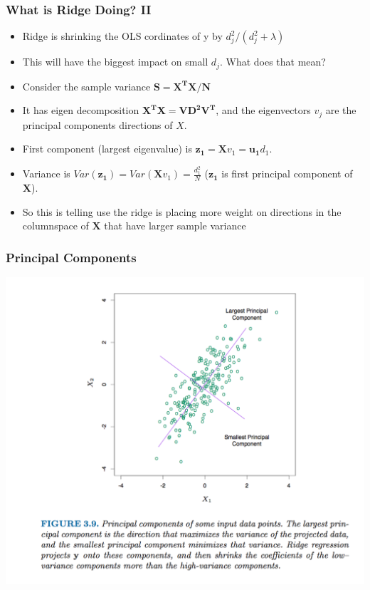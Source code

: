\begin{frame}
    \frametitle{What is Ridge Doing? II}
    \begin{itemize}
        \item Ridge is shrinking the OLS cordinates of y by $d_j^2/(d_j^2 + \lambda)$
        \item This will have the biggest impact on small $d_j$. What does that mean? 
        \item Consider the sample variance $\mathbf{S=X^TX/N}$ 
        \item It has eigen decomposition $\mathbf{X^TX = VD^2V^T}$, and the eigenvectors $v_j$ are the \alert{principal components} directions of $X$. 
        \item First component (largest eigenvalue) is $\mathbf{z_1} = \mathbf{X} v_1 = \mathbf{u_1} d_1$.
        \item Variance is $Var(\mathbf{z_1}) = Var (\mathbf{X} v_1) = \frac{d_1^2}{N}$ ($\mathbf{z_1}$ is first principal component of $\mathbf{X}$).
        \item So this is telling use the ridge is placing more weight on directions in the columnspace of $\mathbf{X}$ that have larger sample variance 
     \end{itemize}
\end{frame} 

\begin{frame}
   \frametitle{Principal Components}
   \vspace{-10pt}
    \begin{center}
    \includegraphics[height=0.85\textheight]{./resources/princompfig}
    \end{center}
\end{frame}
    
